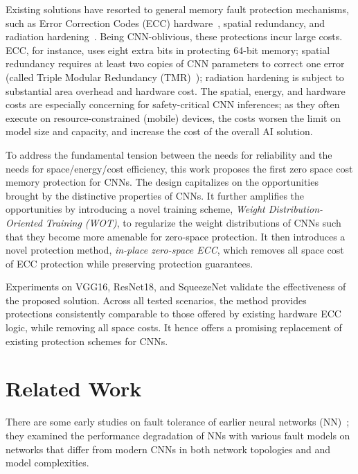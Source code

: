 \documentclass{article}
\begin{document}
Existing solutions have resorted to general memory fault protection mechanisms, such as Error Correction Codes (ECC) hardware~\cite{sridharan2015memory}, spatial redundancy, and radiation hardening~\cite{yu2010overview}. Being CNN-oblivious, these protections incur large costs. ECC, for instance, uses eight extra bits in protecting 64-bit memory; spatial redundancy requires at least two copies of CNN parameters to correct one error (called Triple Modular Redundancy (TMR)~\cite{lyons1962use}); radiation hardening is subject to substantial area overhead and hardware cost. The spatial, energy, and hardware costs are especially concerning for safety-critical CNN inferences; as they often execute on resource-constrained (mobile) devices, the costs worsen the limit on model size and capacity, and increase the cost of the overall AI solution. 

To address the fundamental tension between the needs for reliability and the needs for space/energy/cost efficiency, this work proposes the first zero space cost memory protection for CNNs. The design capitalizes on the opportunities brought by the distinctive properties of CNNs. It further amplifies the opportunities by introducing a novel training scheme, {\em Weight Distribution-Oriented Training (WOT)}, to regularize the weight distributions of CNNs such that they become more amenable for zero-space protection. It then introduces a novel protection method, {\em in-place zero-space ECC}, which removes all space cost of ECC protection while preserving protection guarantees. 




Experiments on VGG16, ResNet18, and SqueezeNet validate the effectiveness of the proposed solution. Across all tested scenarios, the method provides protections consistently comparable to those offered by existing hardware ECC logic, while removing all space costs. It hence offers a promising replacement of existing protection schemes for CNNs.



\section{Related Work}
There are some early studies on fault tolerance of earlier neural networks (NN)~\cite{phatak1995complete, protzel1993performance, torres2017fault}; they examined the performance degradation of NNs with various fault models on networks that differ from modern CNNs in both network topologies and and model complexities.  
\end{document}
